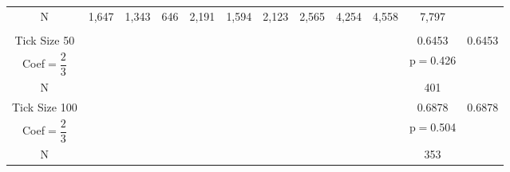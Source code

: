 \documentclass[]{article}
\begin{document}
\begin{landscape}
\begin{table}[!ht]
\begin{tabular}{cccccccccccc}
N & 1,647 & 1,343 & 646 & 2,191 & 1,594 & 2,123 & 2,565 & 4,254 & 4,558 & 7,797 & \\
& & & & & & & & & & & \\
Tick Size 50 & & & & & & & & & & 0.6453 & 0.6453 \\
Coef$=\dfrac{2}{3}$ & & & & & & & & & & p$=$0.426 & \\
N & & & & & & & & & & 401 & \\
Tick Size 100 & & & & & & & & & & 0.6878 & 0.6878 \\
Coef$=\dfrac{2}{3}$ & & & & & & & & & & p$=$0.504 & \\
N & & & & & & & & & & 353 & \\
\hline
\end{tabular}
\end{table}
\end{landscape}
\end{document}

